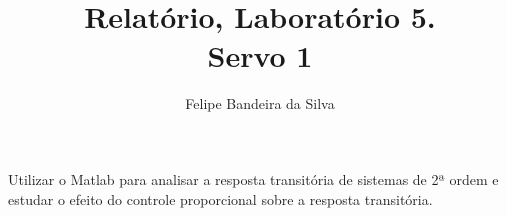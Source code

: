 \documentclass[paper=a4, fontsize=11pt]{article}
\title{Relatório, Laboratório 5.\\Servo 1}
\author{Felipe Bandeira da Silva}
\begin{document}
\maketitle

Utilizar o Matlab para analisar a resposta transitória de sistemas de 2ª ordem e 
estudar o efeito do controle proporcional sobre a resposta transitória.

\newpage

\listoffigures

\newpage
\end{document}
